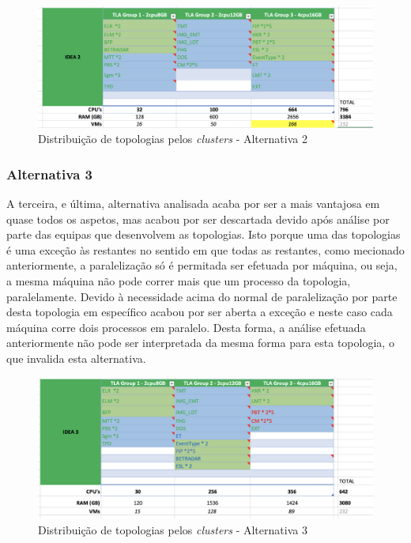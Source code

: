 \begin{figure}[H]
  \centerline{\includegraphics[scale=0.4]{media/content/analise/proposal-2.png}}
  \caption{Distribuição de topologias pelos \textit{clusters} - Alternativa 2}
  \label{proposal-2}
\end{figure}

\subsubsection{Alternativa 3}

A terceira, e última, alternativa analisada acaba por ser a mais vantajosa em quase todos os 
aspetos, mas acabou por ser descartada devido após análise por parte das equipas que desenvolvem as 
topologias. Isto porque uma das topologias é uma exceção às restantes no sentido em que todas as
restantes, como mecionado anteriormente, a paralelização só é permitada ser efetuada por máquina, 
ou seja, a mesma máquina não pode correr mais que um processo da topologia, paralelamente.
Devido à necessidade acima do normal de paralelização por parte desta topologia em específico
acabou por ser aberta a exceção e neste caso cada máquina corre dois processos em paralelo.
Desta forma, a análise efetuada anteriormente não pode ser interpretada da mesma forma para esta
topologia, o que invalida esta alternativa.

\begin{figure}[H]
  \centerline{\includegraphics[scale=0.4]{media/content/analise/proposal-3.png}}
  \caption{Distribuição de topologias pelos \textit{clusters} - Alternativa 3}
  \label{proposal-3}
\end{figure}

